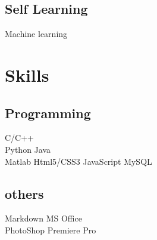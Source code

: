 \documentclass[]{deedy-resume-openfont}
\begin{document}
\begin{minipage}[t]{0.33\textwidth}
\subsection{Self Learning}
Machine learning \\
\sectionsep


\section{Skills}
\subsection{Programming}
C/C++ \\
Python \textbullet{} Java \\
Matlab \textbullet{} Html5/CSS3 \textbullet{} JavaScript \textbullet{} MySQL \\
\sectionsep

\subsection{others}
Markdown \textbullet{} MS Office \\
PhotoShop \textbullet{} Premiere Pro \\
\sectionsep


%
%

\end{minipage} 
\hfill
\end{document}
